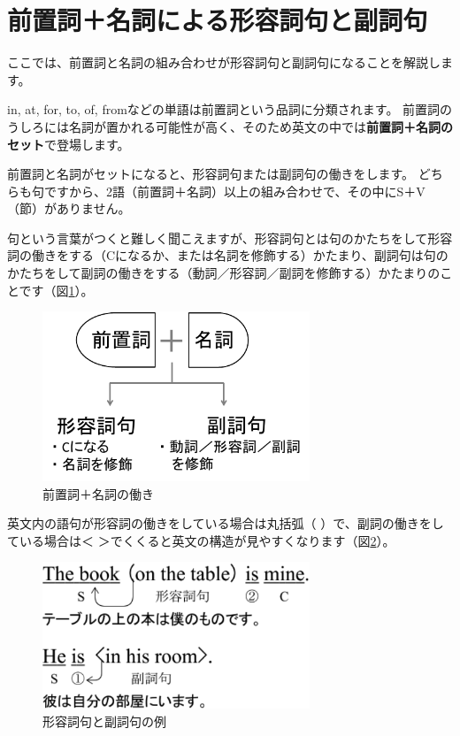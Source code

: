 \documentclass[12pt,titlepage]{jsarticle}
\begin{document}
 \section{前置詞＋名詞による形容詞句と副詞句}
 ここでは、前置詞と名詞の組み合わせが形容詞句と副詞句になることを解説します。
 
 in, at, for, to, of, fromなどの単語は前置詞という品詞に分類されます。
 前置詞のうしろには名詞が置かれる可能性が高く、そのため英文の中では{\bf 前置詞＋名詞のセット}で登場します。

 前置詞と名詞がセットになると、形容詞句または副詞句の働きをします。
 どちらも句ですから、2語（前置詞＋名詞）以上の組み合わせで、その中にS＋V（節）がありません。

 句という言葉がつくと難しく聞こえますが、形容詞句とは句のかたちをして形容詞の働きをする（Cになるか、または名詞を修飾する）かたまり、副詞句は句のかたちをして副詞の働きをする（動詞／形容詞／副詞を修飾する）かたまりのことです（図\ref{fig14}）。
  \begin{figure}[htbp]
   \begin{center}
    \includegraphics[width=8cm]{./figure/fig14.pdf}
    \caption{前置詞＋名詞の働き}
    \label{fig14}
   \end{center}
  \end{figure}

  英文内の語句が形容詞の働きをしている場合は丸括弧（ ）で、副詞の働きをしている場合は＜ ＞でくくると英文の構造が見やすくなります（図\ref{fig15}）。
  \begin{figure}[htbp]
   \begin{center}
    \includegraphics[width=8cm]{./figure/fig15.pdf}
    \caption{形容詞句と副詞句の例}
    \label{fig15}
   \end{center}
  \end{figure}
\end{document}
